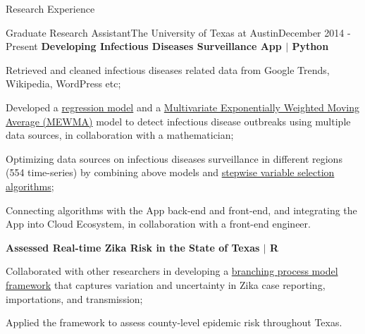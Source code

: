 \documentclass{my_resume} %
\begin{document}

\begin{rSection}{Research Experience}

\begin{rSubsection}{Graduate Research Assistant}{The University of Texas at
  Austin}{December 2014 - Present}
  \textbf{Developing Infectious Diseases Surveillance App $|$ Python}
  \item Retrieved and cleaned infectious diseases related data from Google
    Trends, Wikipedia, WordPress etc;
  \item Developed a \underline{regression model} and a \underline{Multivariate
      Exponentially Weighted Moving Average (MEWMA)} model to detect infectious
      disease outbreaks using multiple data sources, in collaboration with a
      mathematician;
  \item Optimizing data sources on infectious diseases surveillance in
    different regions (554 time-series) by combining above models and
    \underline{stepwise variable selection algorithms};
  \item Connecting algorithms with the App back-end and front-end, and
    integrating the App into Cloud Ecosystem, in collaboration with a front-end
    engineer.

  \textbf{Assessed Real-time Zika Risk in the State of Texas $|$ R}
  \item Collaborated with other researchers in developing a \underline{branching
      process model framework} that captures variation and uncertainty in Zika
      case reporting, importations, and transmission;
  \item Applied the framework to assess county-level epidemic risk throughout
    Texas.

\end{rSubsection}
\end{rSection}
\end{document}
